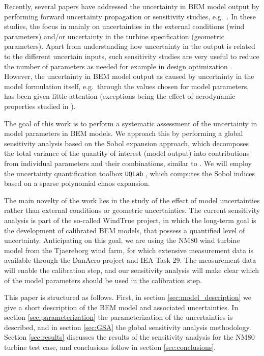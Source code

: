\documentclass[review]{elsarticle}
\numberwithin{equation}{section}
\numberwithin{equation}{section}
\begin{document}
Recently, several papers have addressed the uncertainty in BEM model output by performing forward uncertainty propagation or sensitivity studies, e.g.\ \cite{Echeverria2017,Matthaus2017,Murcia2018,Robertson2018,Bos2019a}. In these studies, the focus in mainly on uncertainties in the external conditions (wind parameters) and/or uncertainty in the turbine specification (geometric parameters). Apart from understanding how uncertainty in the output is related to the different uncertain inputs, such sensitivity studies are very useful to reduce the number of parameters as needed for example in design optimization \cite{Echeverria2017}. However, the uncertainty in BEM model output as caused by uncertainty in the model formulation itself, e.g.\ through the values chosen for model parameters, has been given little attention (exceptions being the effect of aerodynamic properties studied in \cite{Bortolotti2019,Matthaus2017}).

The goal of this work is to perform a systematic assessment of the uncertainty in model parameters in BEM models. We approach this by performing a global sensitivity analysis based on the Sobol expansion approach, which decomposes the total variance of the quantity of interest (model output) into contributions from individual parameters and their combinations, similar to \cite{Echeverria2017,Murcia2018, Rinker2016a}. We will employ the uncertainty quantification toolbox \texttt{UQLab} \cite{uqlab}, which computes the Sobol indices based on a sparse polynomial chaos expansion. 

The main novelty of the work lies in the study of the effect of model uncertainties rather than external conditions or geometric uncertainties. The current sensitivity analysis is part of the so-called WindTrue project, in which the long-term goal is the development of calibrated BEM models, that possess a quantified level of uncertainty. Anticipating on this goal, we are using the NM80 wind turbine model from the Tjaereborg wind farm, for which extensive measurement data is available through the DanAero project \cite{Troldborg2013} and IEA Task 29. The measurement data will enable the calibration step, and our sensitivity analysis will make clear which of the model parameters should be used in the calibration step.

This paper is structured as follows. First, in section \ref{sec:model_description} we give a short description of the BEM model and associated uncertainties. In section \ref{sec:parameterization} the parameterization of the uncertainties is described, and in section \ref{sec:GSA} the global sensitivity analysis methodology. Section \ref{sec:results} discusses the results of the sensitivity analysis for the NM80 turbine test case, and conclusions follow in section \ref{sec:conclusions}.
\end{document}

